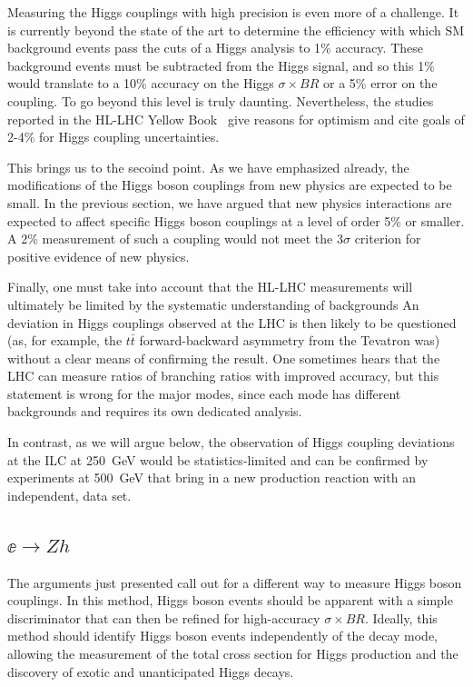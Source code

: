 Measuring  the Higgs couplings with high precision is even more of a challenge.   It is currently beyond the state of the art to determine the efficiency  with which SM background events pass the cuts of a Higgs analysis to 1\% accuracy.   These background events must be subtracted from the Higgs signal, and so this 1\% would translate to a 10\% accuracy on the Higgs $\sigma\times BR$ or a 5\% error on the coupling. To go beyond this level is truly daunting.  Nevertheless, the studies reported in the HL-LHC Yellow Book~\cite{xxx} give reasons for optimism and cite goals of 2-4\%  for Higgs coupling uncertainties.

This brings us to the secoind point.  As we have emphasized already, the modifications of the Higgs boson couplings from new  physics are expected to be small.  In the previous section, we have argued that new physics interactions are expected to affect specific
Higgs boson couplings at a level of order 5\% or smaller.  A 2\% measurement of such a coupling  
would not meet the $3\sigma$ criterion for positive evidence of new physics.

Finally, one must take into account that the HL-LHC measurements will ultimately be limited by the systematic understanding of backgrounds  An deviation in Higgs couplings observed at the LHC is then likely to be questioned (as, for example, the $t\bar t$ forward-backward asymmetry from the Tevatron was) without a clear means of confirming the result. 
One sometimes hears that the LHC can measure ratios of branching ratios with improved accuracy, but this statement is wrong for the major modes, since each mode has different backgrounds and requires its own dedicated analysis. 

 In contrast, as we will argue below, the observation of Higgs coupling deviations at the ILC at  250~GeV would be statistics-limited and can be confirmed by experiments at 500~GeV that bring in a new production reaction with an independent, data set. 


\subsection{$\ee\to Zh$}

The arguments just presented call out for a different way to measure Higgs boson couplings.   In this method, Higgs boson events should be apparent with a simple discriminator that can then be refined for high-accuracy $\sigma\times BR$.  Ideally, this method should identify Higgs boson events independently of the decay mode, allowing the measurement of the total cross section for Higgs production and the discovery of exotic and unanticipated Higgs decays.

